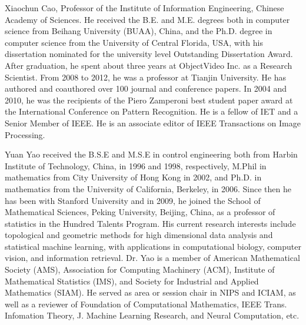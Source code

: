 \documentclass[10pt,journal,cspaper,compsoc]{IEEEtran}
\begin{document}
{\vspace{0cm}\begin{biography}{Xiaochun Cao, Professor of the Institute of Information Engineering, Chinese Academy of Sciences. He received the B.E. and M.E. degrees both in computer science from Beihang University (BUAA), China, and the Ph.D. degree in computer science from the University of Central Florida, USA, with his dissertation nominated for the university level Outstanding Dissertation Award. After graduation, he spent about three years at ObjectVideo Inc. as a Research Scientist. From 2008 to 2012, he was a professor at Tianjin University. He has authored and coauthored over 100 journal and conference papers. In 2004 and 2010, he was the recipients of the Piero Zamperoni best student paper award at the International Conference on Pattern Recognition. He is a fellow of IET and a Senior Member of IEEE. He is an associate editor of IEEE Transactions on Image Processing.}
\end{biography}

\vspace{0cm}\begin{biography}{Yuan Yao received the B.S.E and M.S.E in control engineering both from Harbin Institute of Technology, China, in 1996 and 1998, respectively,
M.Phil in mathematics from City University of Hong Kong in 2002, and Ph.D. in mathematics from the University of California, Berkeley, in 2006. Since then he has been with Stanford University and in 2009, he joined the School of Mathematical Sciences, Peking University, Beijing, China, as a professor of statistics in the Hundred Talents Program. His current research interests include topological and geometric methods for high dimensional data analysis and statistical machine learning, with applications in computational biology, computer vision, and information retrieval. Dr. Yao is a member of American Mathematical Society (AMS), Association for Computing Machinery (ACM), Institute of Mathematical Statistics (IMS), and Society for Industrial and Applied Mathematics (SIAM). He served as area or session chair in NIPS and ICIAM, as well as a reviewer of Foundation of Computational Mathematics, IEEE Trans. Infomation Theory, J.  Machine Learning Research, and Neural Computation, etc.}
\end{biography}
%


}
\end{document}
